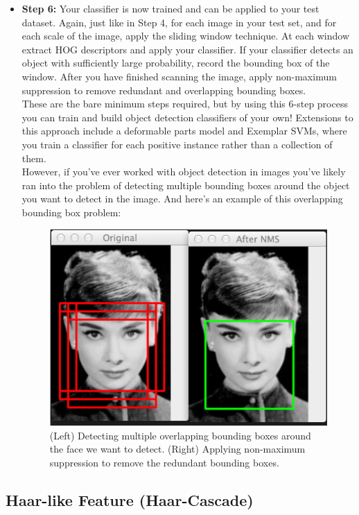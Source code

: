 \begin{itemize}
            \item \textbf{Step 6:} Your classifier is now trained and can be applied to your test dataset. Again, just like in Step 4, for each image in your test set, and for each scale of the image, apply the sliding window technique. 
                At each window extract HOG descriptors and apply your classifier. If your classifier detects an object with sufficiently large probability, record the bounding box of the window. After you have finished scanning the image, 
                apply non-maximum suppression to remove redundant and overlapping bounding boxes. \\ 
                \vspace{2mm}
                These are the bare minimum steps required, but by using this 6-step process you can train and build object detection classifiers of your own! Extensions to this approach include a deformable parts model and Exemplar SVMs, 
                where you train a classifier for each positive instance rather than a collection of them. \\ 
                \vspace{2mm}
                However, if you’ve ever worked with object detection in images you’ve likely ran into the problem of detecting multiple bounding boxes around the object you want to detect in the image. And here’s an example of this overlapping bounding box problem:
                \begin{figure}[H]
                    \centering
                    \includegraphics[width=0.6\linewidth]{img/multiple-overlapping.jpg}
                    \caption{(Left) Detecting multiple overlapping bounding boxes around the face we want to detect. (Right) Applying non-maximum suppression to remove the redundant bounding boxes.}
                \end{figure}
        \end{itemize}
    \subsection{Haar-like Feature (Haar-Cascade)}
